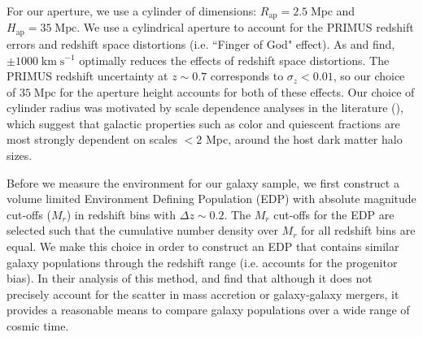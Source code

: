 \documentclass{aastex}
\def \apradius{2.5}
\def \apheight{35}
\begin{document}
For our aperture, we use a cylinder of dimensions: $R_{\mathrm{ap}} =
\apradius\;
\mathrm{Mpc}$ and $H_{\mathrm{ap}} = \apheight\; \mathrm{Mpc}$.  We use a
cylindrical aperture to account for the PRIMUS redshift
errors and redshift space distortions (i.e. ``Finger of God"
effect). As \cite{Cooper:2005aa} and \cite{Gallazzi:2009aa} find, 
$\pm 1000 \; \mathrm{km} \;\mathrm{s^{-1}}$ optimally reduces the effects of redshift space
distortions. The PRIMUS redshift uncertainty at $z \sim 0.7$
corresponds to $\sigma_z < 0.01$, so our choice of $\apheight\;
\mathrm{Mpc}$ for the aperture height accounts for both of these effects. Our choice of
cylinder radius was motivated by scale dependence analyses in the
literature (\citealt{Blanton:2006aa, Wilman:2010aa, Muldrew:2012aa}),
which suggest that galactic properties such as color and quiescent
fractions are most strongly dependent on scales $< 2$ Mpc, around the
host dark matter halo sizes.



Before we measure the environment for our galaxy sample, we first
construct a volume limited Environment Defining Population (EDP) with
absolute magnitude cut-offs ($M_{r}$) in redshift bins with $\Delta z
\sim 0.2$. The $M_{r}$ cut-offs for the EDP are selected such that the
cumulative number density over $M_{r}$ for all redshift bins are
equal.  We make this choice in order to construct an EDP that contains
similar galaxy populations through the redshift range (i.e. accounts
for the progenitor bias). In their analysis of this method,
\cite{Behroozi:2013aa} and \cite{Leja:2013aa} find that although it
does not precisely account for the scatter in mass accretion or
galaxy-galaxy mergers, it provides a reasonable means to compare
galaxy populations over a wide range of cosmic time.
\end{document}
